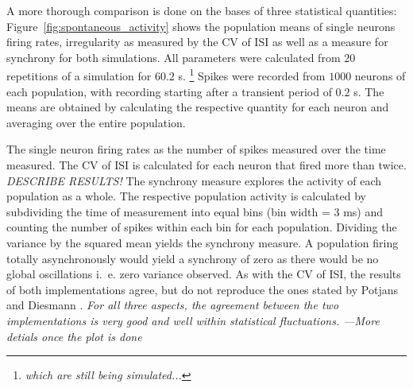 A more thorough comparison is done on the bases of three statistical quantities: 
Figure~\ref{fig:spontaneous_activity} shows the population means of single neurons firing rates, 
irregularity as measured by  the CV of ISI as well as a measure for synchrony for both 
simulations. All parameters were calculated from $20$ repetitions of a simulation for 
$60.2$ s.%
\footnote{\emph{which are still being simulated...}}
Spikes were recorded from $1000$ neurons of each population, with recording 
starting after a transient period of $0.2$ s. 
The means are obtained by calculating the respective quantity for each neuron and averaging over 
the entire population. 

The single neuron firing rates as 
the number of spikes measured over the time measured.
The CV of ISI is calculated for each neuron that fired more than twice.
\emph{DESCRIBE RESULTS!}
The synchrony measure explores the activity of each population as a whole. The respective population
activity is calculated by subdividing the time of measurement into equal bins (bin width = $3$ ms) 
and counting the number of spikes within each bin for each population. 
Dividing the variance by the squared mean yields the synchrony measure. 
A population firing totally asynchronously would yield a synchrony of zero as there would 
be no global oscillations i.~e. zero variance observed.
As with the CV of ISI, the results of both implementations agree, but do not reproduce the ones stated 
by Potjans and Diesmann \cite{potjans2014}. 
\emph{For all three aspects, the agreement between the two implementations is very good 
and well within statistical fluctuations. ---More detials once the plot is done}

